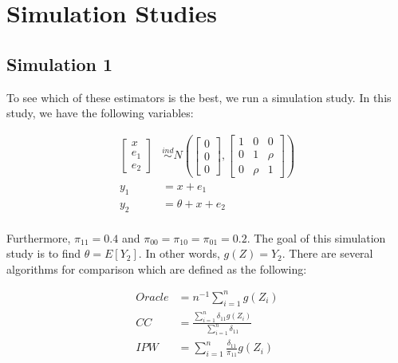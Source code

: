 \documentclass[12pt]{article}
\begin{document}
%
%

\section*{Simulation Studies}

\subsection*{Simulation 1}

To see which of these estimators is the best, we run a simulation study. In this 
study, we have the following variables:

\begin{align*}
  \begin{bmatrix} x \\ e_1 \\ e_2 \end{bmatrix} 
  &\stackrel{ind}{\sim} N\left(\begin{bmatrix} 0 \\ 0 \\ 0 \end{bmatrix}, 
  \begin{bmatrix} 1 & 0 & 0 \\ 0 & 1 & \rho \\ 0 & \rho & 1 \end{bmatrix}\right) \\
  y_1 &= x + e_1 \\
  y_2 &= \theta + x + e_2 \\
\end{align*}

Furthermore, $\pi_{11} = 0.4$ and $\pi_{00} = \pi_{10} = \pi_{01} = 0.2$.
The goal of this simulation study is to find $\theta = E[Y_2]$. In other words,
$g(Z) = Y_2$. There are several algorithms for comparison which are defined 
as the following:

\begin{align*}
  Oracle &= n^{-1} \sum_{i = 1}^n g(Z_i)\\
  CC &= \frac{\sum_{i = 1}^n \delta_{11} g(Z_i)}{\sum_{i = 1}^n \delta_{11}} \\
  IPW &= \sum_{i = 1}^n \frac{\delta_{11}}{\pi_{11}} g(Z_i)\\
\end{align*}
\end{document}

